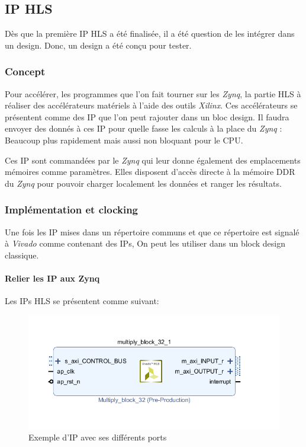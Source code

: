 \documentclass[12pt,a4paper]{article}
\begin{document}
\subsection{IP HLS}
Dès que la première IP HLS a été finalisée, il a été question de les intégrer dans un design. Donc, un design a été conçu pour tester.
\subsubsection{Concept}
Pour accélérer, les programmes que l'on fait tourner sur les \textit{Zynq}, la partie HLS à réaliser des accélérateurs matériels à l'aide des outils \textit{Xilinx}. Ces accélérateurs se présentent comme des IP que l'on peut rajouter dans un bloc design. Il faudra envoyer des donnés à ces IP pour quelle fasse les calculs à la place du \textit{Zynq} : Beaucoup plus rapidement mais aussi non bloquant pour le CPU.

Ces IP sont commandées par le \textit{Zynq} qui leur donne également des emplacements mémoires comme paramètres. Elles disposent d'accès directe à la mémoire DDR du \textit{Zynq} pour pouvoir charger localement les données et ranger les résultats.

\subsubsection{Implémentation et clocking}
Une fois les IP mises dans un répertoire communs et que ce répertoire est signalé à \textit{ Vivado} comme contenant des IPs, On peut les utiliser dans un block design classique.
\paragraph{Relier les IP aux Zynq}
Les IPs HLS se présentent comme suivant:
\begin{figure}[H]
	\centering
	\includegraphics[width=\linewidth,trim=0 50 0 50,clip]{im/ip1.png}	
	\caption{Exemple d'IP avec ses différents ports}
	\label{fig-ip1}
\end{figure}
\end{document}
